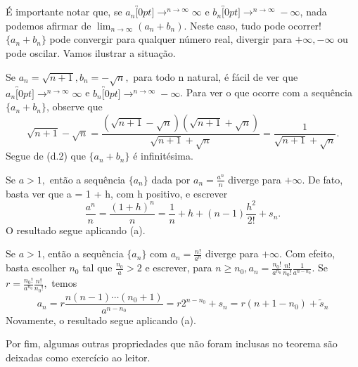 \documentclass[analysis_notes.tex]{subfiles}
\begin{document}
\'E importante notar que, se $a_{n}\overbracket[0pt]{\longrightarrow}^{n\to \infty}\infty$ e $b_{n}\overbracket[0pt]{\longrightarrow}^{n\to \infty}-\infty$, nada
podemos afirmar de $\lim_{n\to\infty}(a_{n}+b_{n}).$ Neste caso, tudo pode ocorrer! $\{a_{n} + b_{n}\} $ pode convergir para qualquer n\'umero real,
divergir para $+\infty, -\infty$ ou pode oscilar. Vamos ilustrar a situa\c c\~ao.
\begin{example}
	Se $a_{n} = \sqrt{n+1}, b_{n} = -\sqrt{n},$ para todo n natural, \'e f\'acil de ver que $a_{n}\overbracket[0pt]{\longrightarrow}^{n\to \infty}\infty$ e $b_{n}\overbracket[0pt]{\longrightarrow}^{n\to \infty}-\infty$.
	Para ver o que ocorre com a sequ\^encia $\{a_{n}+b_{n}\} $, observe que
	$$
		\sqrt{n+1} - \sqrt{n} = \frac{(\sqrt{n+1}-\sqrt{n})(\sqrt{n+1}+\sqrt{n})}{\sqrt{n+1}+\sqrt{n}} = \frac{1}{\sqrt{n+1}+\sqrt{n}}.
	$$
	Segue de (d.2) que $\{a_{n}+b_{n}\} $ \'e infinit\'esima.
\end{example}
\begin{example}
	Se $a > 1,$ ent\~ao a sequ\^encia $\{a_{n}\}$ dada por $a_{n} = \frac{a^{n}}{n}$ diverge para $+\infty.$ De fato, basta ver que
	a = 1 + h, com h positivo, e escrever
	$$
		\frac{a^{n}}{n} = \frac{(1+h)^{n}}{n} = \frac{1}{n} + h + (n-1)\frac{h^{2}}{2!} + s_{n}.
	$$
	O resultado segue aplicando (a).
\end{example}
\begin{example}
	Se $a > 1$, ent\~ao a sequ\^encia $\{a_{n}\}$ com $a_{n} = \frac{n!}{a^{n}}$ diverge para $+\infty.$ Com efeito, basta escolher
	$n_{0}$ tal que $\frac{n_{0}}{a} > 2$ e escrever, para $n\geq{n_{0}}, a_{n} = \frac{n_{0}!}{a^{n_{0}}}\frac{n!}{n_{0}!}\frac{1}{a^{n-n_{0}}}.$
	Se $r = \frac{n_{0}!}{a^{n_{0}}}\frac{n!}{n_{0}!},$ temos
	$$
		a_{n} = r \frac{n(n-1)\cdots(n_{0}+1)}{a^{n-n_{0}}} = r2^{n-n_{0}} + s_{n} = r(n+1 - n_{0}) + \tilde{s}_{n}
	$$
	Novamente, o resultado segue aplicando (a).
\end{example}
Por fim, algumas outras propriedades que n\~ao foram inclusas no teorema s\~ao deixadas como exerc\'icio ao leitor.
\end{document}
